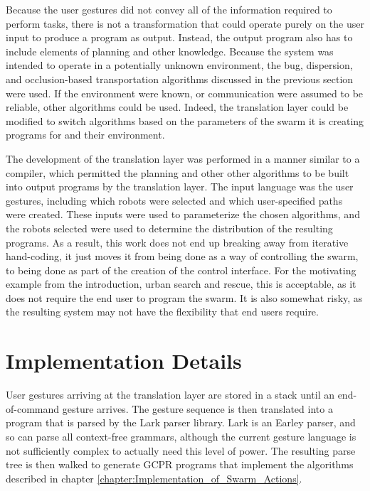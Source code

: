 Because the user gestures did not convey all of the information required to perform tasks, there is not a transformation that could operate purely on the user input to produce a program as output. 
Instead, the output program also has to include elements of planning and other knowledge. 
Because the system was intended to operate in a potentially unknown environment, the bug, dispersion, and occlusion-based transportation algorithms discussed in the previous section were used. 
If the environment were known, or communication were assumed to be reliable, other algorithms could be used. 
Indeed, the translation layer could be modified to switch algorithms based on the parameters of the swarm it is creating programs for and their environment. 

The development of the translation layer was performed in a manner similar to a compiler, which permitted the planning and other other algorithms to be built into output programs by the translation layer. 
The input language was the user gestures, including which robots were selected and which user-specified paths were created. 
These inputs were used to parameterize the chosen algorithms, and the robots selected were used to determine the distribution of the resulting programs.
As a result, this work does not end up breaking away from iterative hand-coding, it just moves it from being done as a way of controlling the swarm, to being done as part of the creation of the control interface. 
For the motivating example from the introduction, urban search and rescue, this is acceptable, as it does not require the end user to program the swarm. 
It is also somewhat risky, as the resulting system may not have the flexibility that end users require. 

\section{Implementation Details}

User gestures arriving at the translation layer are stored in a stack until an end-of-command gesture arrives. 
The gesture sequence is then translated into a program that is parsed by the Lark parser library. 
Lark is an Earley parser, and so can parse all context-free grammars, although the current gesture language is not sufficiently complex to actually need this level of power. 
The resulting parse tree is then walked to generate GCPR programs that implement the algorithms described in chapter \ref{chapter:Implementation_of_Swarm_Actions}.

